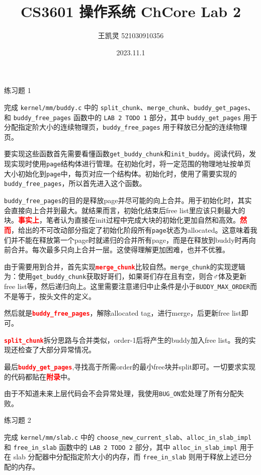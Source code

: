 \documentclass{article}
\newcommand{\customthmname}{}
\newenvironment{prob}[1]
{\renewcommand{\customthmname}{#1}%
	\fontfamily{ptm}\selectfont  %
	\par\bigskip\noindent\Large{\customthmname}\normalsize\par}
{\par\bigskip}
\newcommand{\textbff}[1]{\textcolor{red}{\textbf{#1}}}
\begin{document}
	\title{CS3601 操作系统 ChCore Lab 2}
	\author{王凯灵 521030910356}
	\date{2023.11.1}
	\maketitle
	\begin{prob}{练习题 1}
		完成 \texttt{kernel/mm/buddy.c} 中的 \texttt{split\_chunk}、\texttt{merge\_chunk}、\texttt{buddy\_get\_pages}、 和 \texttt{buddy\_free\_pages} 函数中的 \texttt{LAB 2 TODO 1} 部分，其中 \texttt{buddy\_get\_pages} 用于分配指定阶大小的连续物理页，\texttt{buddy\_free\_pages} 用于释放已分配的连续物理页。
	\end{prob}
	要实现这些函数首先需要看懂函数\texttt{get\_buddy\_chunk}和\texttt{init\_buddy}。阅读代码，发现实现时使用\texttt{page}结构体进行管理。在初始化时，将一定范围的物理地址按单页大小初始化到\texttt{page}中，每页对应一个结构体。初始化时，使用了需要实现的\texttt{buddy\_free\_pages}，所以首先进入这个函数。
	
	\texttt{buddy\_free\_pages}的目的是释放page并尽可能的向上合并。用于初始化时，其实会直接向上合并到最大。就结果而言，初始化结束后free list里应该只剩最大的块。\textbff{事实上}，笔者认为直接在init过程中完成大块的初始化更加自然和高效。\textbff{然而}，给出的不可改动部分指定了初始化阶段所有\texttt{page}状态为allocated。这意味着我们并不能在释放第一个page时就递归的合并所有page，而是在释放到buddy时再向前合并。每次最多只向上合并一层。这使得理解更加困难，也并不优雅。
	
	由于需要用到合并，首先实现\textbff{\texttt{merge\_chunk}}比较自然。\texttt{merge\_chunk}的实现逻辑为：使用\texttt{get\_buddy\_chunk}获取好哥们，如果哥们存在且有空，则合♂体及更新free list等，然后递归向上。这里需要注意递归中止条件是小于\texttt{BUDDY\_MAX\_ORDER}而不是等于，按头文件的定义。
	
	然后就是\textbff{\texttt{buddy\_free\_pages}}，解除allocated tag，进行merge，后更新free list即可。
	
	\textbff{\texttt{split\_chunk}}拆分思路与合并类似，order-1后将产生的buddy加入free list。我的实现还检查了大部分异常情况。
	
	最后\textbff{\texttt{buddy\_get\_pages}},寻找高于所需order的最小free块并split即可。一切要求实现的代码都贴在\textbff{附录}中。
	
	由于不知道未来上层代码会不会异常处理，我使用\texttt{BUG\_ON}宏处理了所有分配失败。
	
	\begin{prob}{练习题 2}
		完成 \texttt{kernel/mm/slab.c} 中的 \texttt{choose\_new\_current\_slab}、\texttt{alloc\_in\_slab\_impl} 和 \texttt{free\_in\_slab} 函数中的 \texttt{LAB 2 TODO 2} 部分，其中 \texttt{alloc\_in\_slab\_impl} 用于在 slab 分配器中分配指定阶大小的内存，而 \texttt{free\_in\_slab} 则用于释放上述已分配的内存。
	\end{prob}
	
\end{document}
